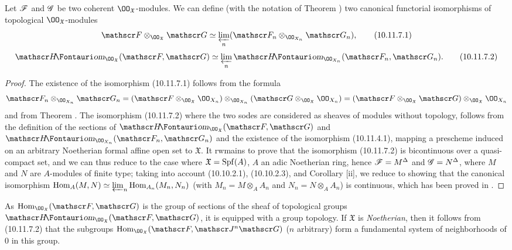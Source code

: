 \begin{prop}[10.11.7]
\label{1.10.11.7}
Let $\mathscr{F}$ and $\mathscr{G}$ be two coherent $\OO_\mathfrak{X}$-modules.
We can define (with the notation of Theorem ) two canonical functorial isomorphisms of topological $\OO_\mathfrak{X}$-modules 
\[
  \sh{F}\otimes_{\OO_\mathfrak{X}}\sh{G}\isoto\varprojlim_n(\sh{F}_n\otimes_{\OO_{X_n}}\sh{G}_n),
  \tag{10.11.7.1}
\]
\[
  \shHom_{\OO_\mathfrak{X}}(\sh{F},\sh{G})\isoto\varprojlim_n\shHom_{\OO_{X_n}}(\sh{F}_n,\sh{G}_n).
  \tag{10.11.7.2}
\]
\end{prop}

\begin{proof}
\label{proof-1.10.11.7}
The existence of the isomorphism (10.11.7.1) follows from the formula
\[
  \sh{F}_n\otimes_{\OO_{X_n}}\sh{G}_n=(\sh{F}\otimes_{\OO_\mathfrak{X}}\OO_{X_n})\otimes_{\OO_{X_n}}(\sh{G}\otimes_{\OO_\mathfrak{X}}\OO_{X_n})=(\sh{F}\otimes_{\OO_\mathfrak{X}}\sh{G})\otimes_{\OO_\mathfrak{X}}\OO_{X_n}
\]
and from Theorem .
The isomorphism (10.11.7.2) where the two sodes are considered as sheaves of modules without topology, follows from the definition of the sections of $\shHom_{\OO_\mathfrak{X}}(\sh{F},\sh{G})$ and $\shHom_{\OO_{X_n}}(\sh{F}_n,\sh{G}_n)$ and the existence of the isomorphism (10.11.4.1), mapping a prescheme induced on an arbitrary Noetherian formal affine open set to $\mathfrak{X}$.
It rwmains to prove that the isomorphism (10.11.7.2) is bicontinuous over a quasi-compact set, and we can thus reduce to the case where $\mathfrak{X}=\operatorname{Spf}(A)$, $A$ an adic Noetherian ring, hence  $\mathscr{F}=M^\Delta$ and $\mathscr{G}=N^\Delta$, where $M$ and $N$ are $A$-modules of finite type; taking into account (10.10.2.1), (10.10.2.3), and Corollary [ii], we reduce to showing that the canonical isomorphism $\operatorname{Hom}_A(M,N)\simeq\varprojlim_n\operatorname{Hom}_{A_n}(M_n,N_n)$ (with $M_n=M\otimes_A A_n$ and $N_n=N\otimes_A A_n$) is continuous, which has been proved in .
\end{proof}

\begin{env}[10.11.8]
\label{1.10.11.8}
As $\Hom_{\OO_\mathfrak{X}}(\sh{F},\sh{G})$ is the group of sections of the sheaf of topological groups $\shHom_{\OO_\mathfrak{X}}(\sh{F},\sh{G})$, it is equipped with a group topology.
If $\mathfrak{X}$ is \emph{Noetherian}, then it follows from (10.11.7.2) that the subgroups $\Hom_{\OO_\mathfrak{X}}(\sh{F},\sh{J}^n\sh{G})$ ($n$ arbitrary) form a fundamental system of neighborhoods of $0$ in this group.
\end{env}

